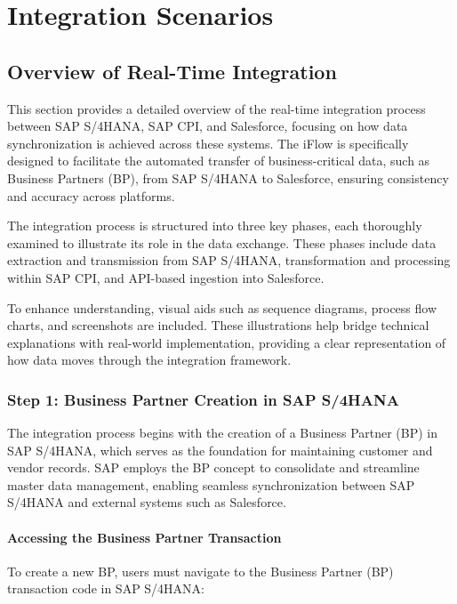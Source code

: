 
\chapter{Integration Scenarios}
\section{Overview of Real-Time Integration}
This section provides a detailed overview of the real-time integration process between SAP S/4HANA, SAP CPI, and Salesforce, focusing on how data synchronization is achieved across these systems. The iFlow is specifically designed to facilitate the automated transfer of business-critical data, such as Business Partners (BP), from SAP S/4HANA to Salesforce, ensuring consistency and accuracy across platforms.

The integration process is structured into three key phases, each thoroughly examined to illustrate its role in the data exchange. These phases include data extraction and transmission from SAP S/4HANA, transformation and processing within SAP CPI, and API-based ingestion into Salesforce.

To enhance understanding, visual aids such as sequence diagrams, process flow charts, and screenshots are included. These illustrations help bridge technical explanations with real-world implementation, providing a clear representation of how data moves through the integration framework.

\subsection{Step 1: Business Partner Creation in SAP S/4HANA}

The integration process begins with the creation of a Business Partner (BP) in SAP S/4HANA, which serves as the foundation for maintaining customer and vendor records. SAP employs the BP concept to consolidate and streamline master data management, enabling seamless synchronization between SAP S/4HANA and external systems such as Salesforce.

\subsubsection{Accessing the Business Partner Transaction}
To create a new BP, users must navigate to the Business Partner (BP) transaction code in SAP S/4HANA:

